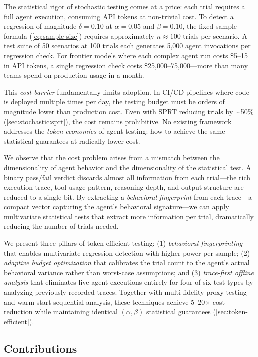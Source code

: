 The statistical rigor of stochastic testing comes at a price: each
trial requires a full agent execution, consuming API tokens at
non-trivial cost. To detect a regression of magnitude $\delta = 0.10$
at $\alpha = 0.05$ and $\beta = 0.10$, the fixed-sample formula
(\cref{eq:sample-size}) requires approximately $n \approx 100$ trials
per scenario. A test suite of 50 scenarios at 100 trials each
generates 5{,}000 agent invocations per regression check. For
frontier models where each complex agent run costs \$5--15 in API
tokens, a single regression check costs \$25{,}000--75{,}000---more
than many teams spend on production usage in a month.

This \emph{cost barrier} fundamentally limits adoption. In CI/CD
pipelines where code is deployed multiple times per day, the testing
budget must be orders of magnitude lower than production cost. Even
with SPRT reducing trials by $\sim$50\% (\cref{sec:stochastic:sprt}),
the cost remains prohibitive. No existing framework addresses the
\emph{token economics} of agent testing: how to achieve the same
statistical guarantees at radically lower cost.

We observe that the cost problem arises from a mismatch between the
dimensionality of agent behavior and the dimensionality of the
statistical test. A binary pass/fail verdict discards almost all
information from each trial---the rich execution trace, tool usage
pattern, reasoning depth, and output structure are reduced to a single
bit. By extracting a \emph{behavioral fingerprint} from each
trace---a compact vector capturing the agent's behavioral
signature---we can apply multivariate statistical tests that
extract more information per trial, dramatically reducing the number
of trials needed.

We present three pillars of token-efficient testing: (1)
\emph{behavioral fingerprinting} that enables multivariate regression
detection with higher power per sample; (2) \emph{adaptive budget
optimization} that calibrates the trial count to the agent's actual
behavioral variance rather than worst-case assumptions; and (3)
\emph{trace-first offline analysis} that eliminates live agent
executions entirely for four of six test types by analyzing
previously recorded traces. Together with multi-fidelity proxy
testing and warm-start sequential analysis, these techniques achieve
5--20$\times$ cost reduction while maintaining identical
$(\alpha, \beta)$ statistical guarantees
(\cref{sec:token-efficient}).

\subsection{Contributions}
\label{sec:intro:contributions}

